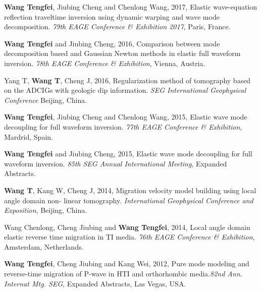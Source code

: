 \begin{resume}
  \begin{enumerate}[{[}1{]}]
	  \item {\bf{Wang Tengfei}}, Jiubing Cheng and Chenlong Wang, 2017, Elastic wave-equation reflection
		  traveltime inversion using dynamic warping and wave mode decomposition. \emph{79th EAGE
		  Conference \& Exhibition 2017}, Paris, France.
	  \item {\bf{Wang Tengfei}} and Jiubing Cheng, 2016, Comparison between mode decomposition based and
		  Gaussian Newton methods in elastic full waveform inversion. \emph{ 78th EAGE Conference \&
		  Exhibition}, Vienna, Austria.
	  \item Yang T, {\bf{Wang T}}, Cheng J, 2016, Regularization method of tomography based on the ADCIGs
		  with geologic dip information. \emph{SEG International Geophysical
		  Conference} Beijing, China.
	  \item {\bf{Wang Tengfei}}, Jiubing Cheng and Chenlong Wang, 2015, Elastic wave mode decoupling for
		  full waveform inversion. \emph{77th EAGE Conference \& Exhibition}, Mardrid, Spain.
	  \item {\bf{Wang Tengfei}} and Jiubing Cheng, 2015, Elastic wave mode decoupling for full waveform
		  inversion. \emph{85th SEG Annual International Meeting}, Expanded Abstracts.
	  \item   {\bf{Wang T}}, Kang W, Cheng J, 2014, Migration velocity model building using local angle domain non-
		  linear tomography. \emph{International Geophysical Conference and Exposition}, 
		  Beijing, China. 
	  \item Wang Chenlong, Cheng Jiubing and {\bf{Wang Tengfei}}, 2014, Local angle domain elastic reverse
		  time migration in TI media. \emph{76th EAGE Conference \& Exhibition}, Amsterdam,
		  Netherlands. 
	  \item {\bf{Wang Tengfei}}, Cheng Jiubing and Kang Wei, 2012, Pure mode modeling and reverse-time
		  migration of P-wave in HTI and orthorhombic media.\emph{82nd Ann.
		  Internat Mtg. SEG}, Expanded Abstracts, Las Vegas, USA.
			  
  \end{enumerate}
\end{resume}
